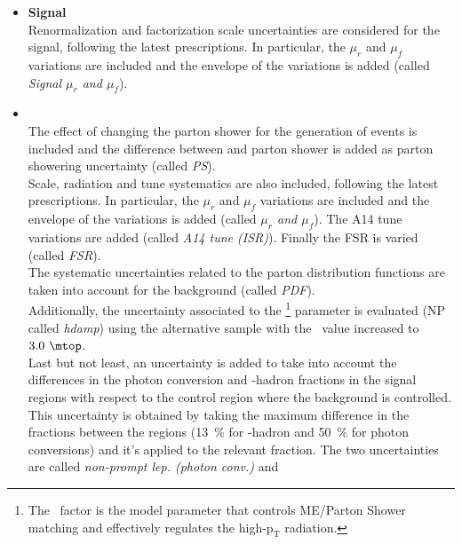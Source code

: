 \begin{itemize}	
	\item \textbf{Signal} \\ 
	Renormalization and factorization scale uncertainties are considered for the signal, following the
	latest prescriptions. In particular, the $\mu_r$ and $\mu_f$
	variations are included and the envelope of the variations is added 
	(called \textit{Signal $\mu_r$ and $\mu_f$}). \\
	\item \textbf{\ttbar} \\
	The effect of changing the parton shower for the generation of \ttbar events is
	included and the difference between \PythiaEight and 
	parton shower is added as \ttbar parton showering uncertainty (called
	\textit{\ttbar PS}). \\
	Scale, radiation and tune systematics are also included, following the
	latest prescriptions. In particular, the $\mu_r$ and $\mu_f$
	variations are included and the envelope of the variations is added 
	(called \textit{\ttbar $\mu_r$ and $\mu_f$}). The A14 tune
	variations are added (called \textit{\ttbar A14 tune (ISR)}). Finally the FSR is varied (called \textit{\ttbar FSR}). \\  
	The systematic uncertainties related to the parton distribution
	functions are taken into account for the \ttbar background (called
	\textit{\ttbar PDF}). \\
	Additionally, the uncertainty associated to the \hdamp\footnote{The \hdamp\ factor is the model parameter that controls ME/Parton Shower matching and effectively regulates the high-$\mathrm{p_{T}}$ radiation.} parameter is evaluated (NP called \textit{\ttbar hdamp})
	using the alternative sample with the \hdamp\ value increased to $3.0~\mtop$.\\
	Last but not least, an uncertainty is added to take into account the differences in the
	photon conversion and \Pqb-hadron fractions in the signal regions with
	respect to the \ttbar control region where the \ttbar background is
	controlled. 
	This uncertainty is obtained by taking the maximum
	difference in the fractions between the regions (\SI{13}{\%} for
	\Pqb-hadron and \SI{50}{\%} for photon conversions) and it's applied
	to the relevant fraction. 
	The two uncertainties are called
	\textit{\ttbar non-prompt lep. (photon conv.)} and 

\end{itemize}

